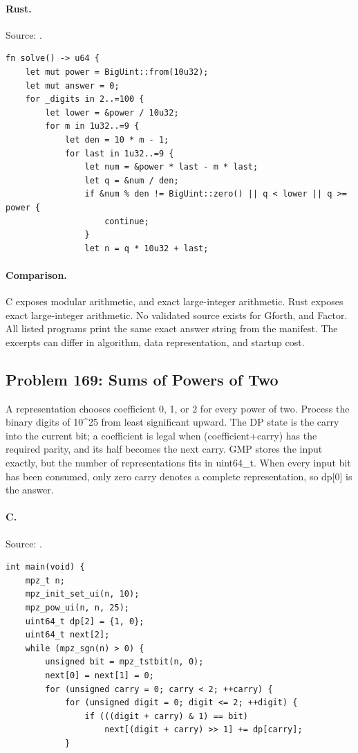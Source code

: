 \paragraph{Rust.} Source: .
\begin{lstlisting}
fn solve() -> u64 {
    let mut power = BigUint::from(10u32);
    let mut answer = 0;
    for _digits in 2..=100 {
        let lower = &power / 10u32;
        for m in 1u32..=9 {
            let den = 10 * m - 1;
            for last in 1u32..=9 {
                let num = &power * last - m * last;
                let q = &num / den;
                if &num % den != BigUint::zero() || q < lower || q >= power {
                    continue;
                }
                let n = q * 10u32 + last;
\end{lstlisting}

\paragraph{Comparison.}
C exposes modular arithmetic, and exact large-integer arithmetic. Rust exposes exact large-integer arithmetic.
No validated source exists for Gforth, and Factor.
All listed programs print the same exact answer string from the manifest. The excerpts can differ in algorithm, data representation, and startup cost.

\subsection{Problem 169: Sums of Powers of Two}
\label{walkthrough:p169}
A representation chooses coefficient 0, 1, or 2 for every power of two. Process the binary digits of 10\textasciicircum{}25 from least significant upward. The DP state is the carry into the current bit; a coefficient is legal when (coefficient+carry) has the required parity, and its half becomes the next carry. GMP stores the input exactly, but the number of representations fits in uint64\_t. When every input bit has been consumed, only zero carry denotes a complete representation, so dp[0] is the answer.

\paragraph{C.} Source: .
\begin{lstlisting}
int main(void) {
    mpz_t n;
    mpz_init_set_ui(n, 10);
    mpz_pow_ui(n, n, 25);
    uint64_t dp[2] = {1, 0};
    uint64_t next[2];
    while (mpz_sgn(n) > 0) {
        unsigned bit = mpz_tstbit(n, 0);
        next[0] = next[1] = 0;
        for (unsigned carry = 0; carry < 2; ++carry) {
            for (unsigned digit = 0; digit <= 2; ++digit) {
                if (((digit + carry) & 1) == bit)
                    next[(digit + carry) >> 1] += dp[carry];
            }
\end{lstlisting}

